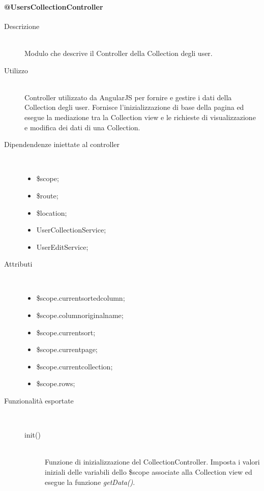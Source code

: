 \paragraph{@UsersCollectionController}
\begin{description}
 \item[Descrizione] \hfill \\
 Modulo che descrive il Controller della Collection degli user.
 
 \item[Utilizzo] \hfill \\
 Controller utilizzato da AngularJS per fornire e gestire i dati della Collection degli user.
 Fornisce l'inizializzazione di base della pagina ed esegue la mediazione tra la Collection view
 e le richieste di visualizzazione e modifica dei dati di una Collection.
 
 \item[Dipendendenze iniettate al controller] \hfill \\
 \begin{itemize}
  \item \$scope;
  \item \$route;
  \item \$location;
  \item UserCollectionService;
  \item UserEditService;
 \end{itemize}
 
 \item[Attributi] \hfill \\
 \begin{itemize}
 \item \$scope.current\textunderscore sorted\textunderscore column;
 \item \$scope.column\textunderscore original\textunderscore name;
 \item \$scope.current\textunderscore sort;
 \item \$scope.current\textunderscore page;
 \item \$scope.current\textunderscore collection;
 \item \$scope.rows;
 \end{itemize}
 
 \item[Funzionalità esportate] \hfill \\
 \begin{description}
  \item[init()] \hfill \\
  Funzione di inizializzazione del CollectionController. Imposta i valori iniziali delle variabili dello
  \$scope associate alla Collection view ed esegue la funzione \emph{getData()}.
  

\end{description}
\end{description}
